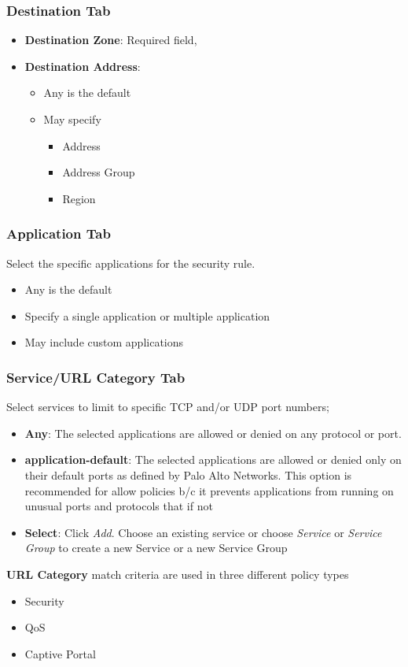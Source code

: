 \subsubsection{Destination Tab}
    \begin{itemize}
        \item \textbf{Destination Zone}:  Required field, 
        \item \textbf{Destination Address}:
            \begin{itemize}
                \item Any is the default
                \item May specify
                    \begin{itemize}
                        \item Address
                        \item Address Group
                        \item Region
                    \end{itemize}
            \end{itemize}
    \end{itemize}

\subsubsection{Application Tab}
Select the specific applications for the security rule.
    \begin{itemize}
        \item Any is the default
        \item Specify a single application or multiple application
        \item May include custom applications
    \end{itemize}
    
\subsubsection{Service/URL Category Tab}
Select services to limit to specific TCP and/or UDP port numbers;
    \begin{itemize}
        \item \textbf{Any}:  The selected applications are allowed or denied on any protocol or port.
        \item \textbf{application-default}: The selected applications are allowed or denied only on their default ports as defined by Palo Alto Networks. This option is recommended for allow policies b/c it prevents applications from running on unusual ports and protocols that if not 
        \item \textbf{Select}: Click \textit{Add}. Choose an existing service or choose \textit{Service} or \textit{Service Group} to create a new Service or a new Service Group
    \end{itemize}
\textbf{URL Category} match criteria are used in three different policy types
    \begin{itemize}
        \item Security
        \item QoS
        \item Captive Portal
    \end{itemize}
    
